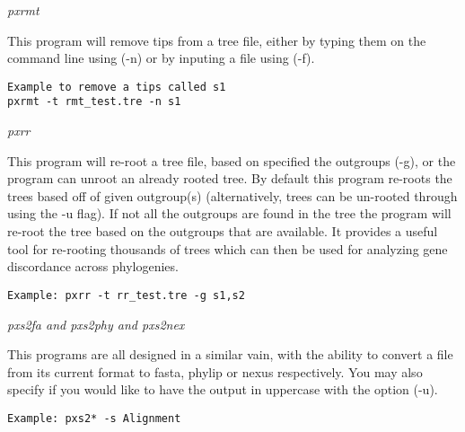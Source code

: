 \documentclass[12pt,letterpaper]{article}
\renewcommand{\subsection}[1]{%
\bigskip
\begin{center}
\begin{large}
\normalfont\itshape #1
\end{large}
\end{center}}
\begin{document}
\subsection{pxrmt}

This program will remove tips from a tree file, either by typing them on the command line using (-n) or by inputing a file using (-f).

\begin{flushleft}
\begin{verbatim}
Example to remove a tips called s1
pxrmt -t rmt_test.tre -n s1
\end{verbatim}
\end{flushleft}

\subsection{pxrr}

This program will re-root a tree file, based on specified the outgroups (-g), or the program can unroot an already rooted tree. By default this program re-roots the trees based off of given outgroup(s) (alternatively, trees can be un-rooted through using the -u flag). If not all the outgroups are found in the tree the program will re-root the tree based on the outgroups that are available. It provides a useful tool for re-rooting thousands of trees which can then be used for analyzing gene discordance across phylogenies.

\begin{flushleft}
\begin{verbatim}
Example: pxrr -t rr_test.tre -g s1,s2
\end{verbatim}
\end{flushleft}

\subsection{pxs2fa and pxs2phy and  pxs2nex}

This programs are all designed in a similar vain, with the ability to convert a file from its current format to fasta, phylip or nexus respectively. You may also specify if you would like to have the output in uppercase with the option (-u).


\begin{flushleft}
\begin{verbatim}
Example: pxs2* -s Alignment
\end{verbatim}
\end{flushleft}
\end{document}

